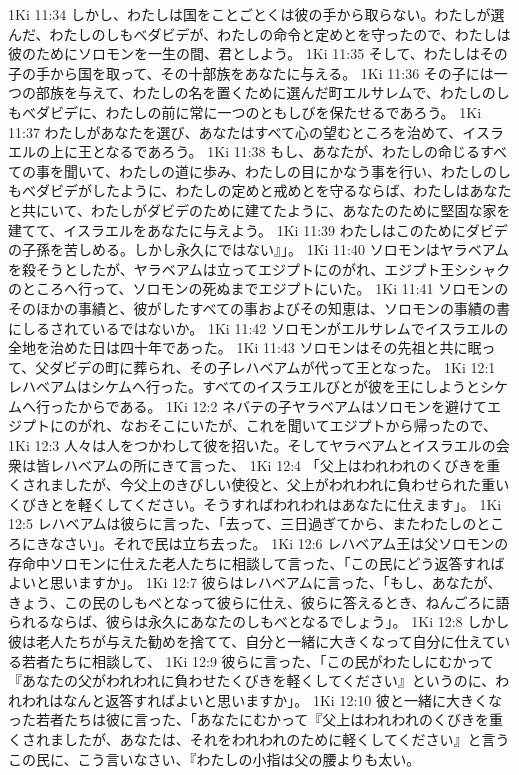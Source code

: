 1Ki 11:34  しかし、わたしは国をことごとくは彼の手から取らない。わたしが選んだ、わたしのしもべダビデが、わたしの命令と定めとを守ったので、わたしは彼のためにソロモンを一生の間、君としよう。
1Ki 11:35  そして、わたしはその子の手から国を取って、その十部族をあなたに与える。
1Ki 11:36  その子には一つの部族を与えて、わたしの名を置くために選んだ町エルサレムで、わたしのしもべダビデに、わたしの前に常に一つのともしびを保たせるであろう。
1Ki 11:37  わたしがあなたを選び、あなたはすべて心の望むところを治めて、イスラエルの上に王となるであろう。
1Ki 11:38  もし、あなたが、わたしの命じるすべての事を聞いて、わたしの道に歩み、わたしの目にかなう事を行い、わたしのしもべダビデがしたように、わたしの定めと戒めとを守るならば、わたしはあなたと共にいて、わたしがダビデのために建てたように、あなたのために堅固な家を建てて、イスラエルをあなたに与えよう。
1Ki 11:39  わたしはこのためにダビデの子孫を苦しめる。しかし永久にではない』」。
1Ki 11:40  ソロモンはヤラベアムを殺そうとしたが、ヤラベアムは立ってエジプトにのがれ、エジプト王シシャクのところへ行って、ソロモンの死ぬまでエジプトにいた。
1Ki 11:41  ソロモンのそのほかの事績と、彼がしたすべての事およびその知恵は、ソロモンの事績の書にしるされているではないか。
1Ki 11:42  ソロモンがエルサレムでイスラエルの全地を治めた日は四十年であった。
1Ki 11:43  ソロモンはその先祖と共に眠って、父ダビデの町に葬られ、その子レハベアムが代って王となった。
1Ki 12:1  レハベアムはシケムへ行った。すべてのイスラエルびとが彼を王にしようとシケムへ行ったからである。
1Ki 12:2  ネバテの子ヤラベアムはソロモンを避けてエジプトにのがれ、なおそこにいたが、これを聞いてエジプトから帰ったので、
1Ki 12:3  人々は人をつかわして彼を招いた。そしてヤラベアムとイスラエルの会衆は皆レハベアムの所にきて言った、
1Ki 12:4  「父上はわれわれのくびきを重くされましたが、今父上のきびしい使役と、父上がわれわれに負わせられた重いくびきとを軽くしてください。そうすればわれわれはあなたに仕えます」。
1Ki 12:5  レハベアムは彼らに言った、「去って、三日過ぎてから、またわたしのところにきなさい」。それで民は立ち去った。
1Ki 12:6  レハベアム王は父ソロモンの存命中ソロモンに仕えた老人たちに相談して言った、「この民にどう返答すればよいと思いますか」。
1Ki 12:7  彼らはレハベアムに言った、「もし、あなたが、きょう、この民のしもべとなって彼らに仕え、彼らに答えるとき、ねんごろに語られるならば、彼らは永久にあなたのしもべとなるでしょう」。
1Ki 12:8  しかし彼は老人たちが与えた勧めを捨てて、自分と一緒に大きくなって自分に仕えている若者たちに相談して、
1Ki 12:9  彼らに言った、「この民がわたしにむかって『あなたの父がわれわれに負わせたくびきを軽くしてください』というのに、われわれはなんと返答すればよいと思いますか」。
1Ki 12:10  彼と一緒に大きくなった若者たちは彼に言った、「あなたにむかって『父上はわれわれのくびきを重くされましたが、あなたは、それをわれわれのために軽くしてください』と言うこの民に、こう言いなさい、『わたしの小指は父の腰よりも太い。
